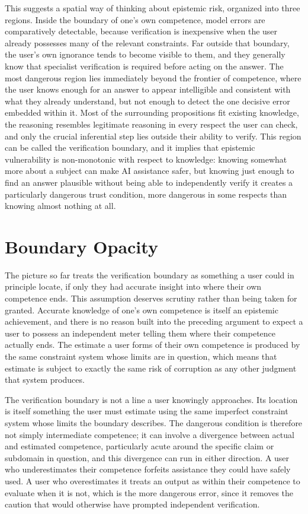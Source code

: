 \documentclass[11pt]{article}
\begin{document}
This suggests a spatial way of thinking about epistemic risk, organized into three regions. Inside the boundary of one's own competence, model errors are comparatively detectable, because verification is inexpensive when the user already possesses many of the relevant constraints. Far outside that boundary, the user's own ignorance tends to become visible to them, and they generally know that specialist verification is required before acting on the answer. The most dangerous region lies immediately beyond the frontier of competence, where the user knows enough for an answer to appear intelligible and consistent with what they already understand, but not enough to detect the one decisive error embedded within it. Most of the surrounding propositions fit existing knowledge, the reasoning resembles legitimate reasoning in every respect the user can check, and only the crucial inferential step lies outside their ability to verify. This region can be called the verification boundary, and it implies that epistemic vulnerability is non-monotonic with respect to knowledge: knowing somewhat more about a subject can make AI assistance safer, but knowing just enough to find an answer plausible without being able to independently verify it creates a particularly dangerous trust condition, more dangerous in some respects than knowing almost nothing at all.

\section{Boundary Opacity}

The picture so far treats the verification boundary as something a user could in principle locate, if only they had accurate insight into where their own competence ends. This assumption deserves scrutiny rather than being taken for granted. Accurate knowledge of one's own competence is itself an epistemic achievement, and there is no reason built into the preceding argument to expect a user to possess an independent meter telling them where their competence actually ends. The estimate a user forms of their own competence is produced by the same constraint system whose limits are in question, which means that estimate is subject to exactly the same risk of corruption as any other judgment that system produces.

The verification boundary is not a line a user knowingly approaches. Its location is itself something the user must estimate using the same imperfect constraint system whose limits the boundary describes. The dangerous condition is therefore not simply intermediate competence; it can involve a divergence between actual and estimated competence, particularly acute around the specific claim or subdomain in question, and this divergence can run in either direction. A user who underestimates their competence forfeits assistance they could have safely used. A user who overestimates it treats an output as within their competence to evaluate when it is not, which is the more dangerous error, since it removes the caution that would otherwise have prompted independent verification.
\end{document}
